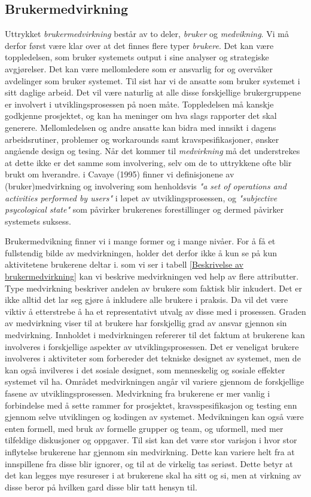 \subsection{Brukermedvirkning}
\label{chp: medvirkning}

Uttrykket \emph{brukermedvirkning} består av to deler, \emph{bruker} og \emph{medvikning}. Vi må derfor først være klar over at det finnes flere typer \emph{brukere}. Det kan være toppledelsen, som bruker systemets output i sine analyser og strategiske avgjørelser. Det kan være mellomledere som er ansvarlig for og overvåker avdelinger som bruker systemet. Til sist har vi de ansatte som bruker systemet i sitt daglige arbeid. Det vil være naturlig at alle disse forskjellige brukergruppene er involvert i utviklingsprosessen på noen måte. Toppledelsen må kanskje godkjenne prosjektet, og kan ha meninger om hva slags rapporter det skal generere. Mellomledelsen og andre ansatte kan bidra med innsikt i dagens arbeidsrutiner, problemer og workarounds samt kravspesifikasjoner, ønsker angående design og tesing. Når det kommer til \emph{medvirkning} må det understrekes at dette ikke er det samme som involvering, selv om de to uttrykkene ofte blir brukt om hverandre. i Cavaye (1995) finner vi definisjonene av (bruker)medvirkning og involvering som henholdsvis \emph{"a set of operations and activities performed by users"} i løpet av utviklingsprosessen, og \emph{"subjective psycological state"} som påvirker brukerenes forestillinger og dermed påvirker systemets suksess.

\noindent
Brukermedvikning finner vi i mange former og i mange nivåer. For å få et fullstendig bilde av medvirkningen, holder det derfor ikke å kun se på kun aktivitetene brukerene deltar i. som vi ser i tabell \ref{Beskrivelse av brukermedvirkning} kan vi beskrive medvirkningen ved help av flere attributter. Type medvirkning beskriver andelen av brukere som faktisk blir inkudert. Det er ikke alltid det lar seg gjøre å inkludere alle brukere i praksis. Da vil det være viktiv å etterstrebe å ha et representativt utvalg av disse med i prosessen. Graden av medvirkning viser til at brukere har forskjellig grad av ansvar gjennon sin medvirkning. Innholdet i medvirkningen refererer til det faktum at brukerene kan involveres i forskjellige aspekter av utviklingsprosessen. Det er veneligat brukere involveres i aktiviteter som forbereder det tekniske designet av systemet, men de kan også invilveres i det sosiale designet, som menneskelig og sosiale effekter systemet vil ha. Området medvirkningen angår vil variere gjennom de forskjellige fasene av utviklingsprosessen. Medvirkning fra brukerene er mer vanlig i forbindelse med å sette rammer for prosjektet, kravsspesifikasjon og testing enn gjennom selve utviklingen og kodingen av systemet. Medvikningen kan også være enten formell, med bruk av formelle grupper og team, og uformell, med mer tilfeldige diskusjoner og oppgaver. Til sist kan det være stor varisjon i hvor stor inflytelse brukerene har gjennom sin medvirkning. Dette kan variere helt fra at innspillene fra disse blir ignorer, og til at de virkelig tas seriøst. Dette betyr at det kan legges mye resureser i at brukerene skal ha sitt og si, men at virkning av disse beror på hvilken gard disse blir tatt hensyn til.

